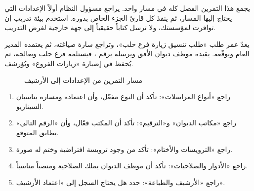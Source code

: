 يجمع هذا التمرين الفصل كله في مسار واحد. يراجع مسؤول النظام أولاً الإعدادات التي يحتاج إليها المسار، ثم ينفذ كل قارئ الجزء الخاص بدوره. استخدم بيئة تدريب إن توافرت لمؤسستك، ولا ترسل كتاباً حقيقياً إلى جهة خارجية لغرض التدريب.

\begin{rcnote}
يعدّ عمر طلب «طلب تنسيق زيارة فرع حلب»، وتراجع سارة صياغته، ثم يعتمده المدير العام ويوقّعه. يقيده موظف ديوان الأفق ويرسله برقم ، فيستلمه فرع حلب ويعالجه، ثم يُحفظ في إضبارة «زيارات الفروع» ويُؤرشف.
\end{rcnote}

\begin{figure}[H]
\centering
{}
\rclegend
\caption{مسار التمرين من الإعدادات إلى الأرشيف}
\label{fig:correspondence-practice-screen}
\end{figure}

\begin{enumerate}
\item راجع «أنواع المراسلات»: تأكد أن النوع مفعّل، وأن اعتماده ومساره يناسبان السيناريو.
\item راجع «مكاتب الديوان» و«الترقيم»: تأكد أن المكتب فعّال، وأن «الرقم التالي» يطابق المتوقع.
\item راجع «الترويسات والأختام»: تأكد من وجود ترويسة افتراضية وختم له صورة.
\item راجع «الأدوار والصلاحيات»: تأكد أن موظف الديوان يملك الصلاحية ومنصباً مناسباً.
\item راجع «الأرشيف والطباعة»: حدد هل يحتاج السجل إلى «اعتماد الأرشيف».
\end{enumerate}

